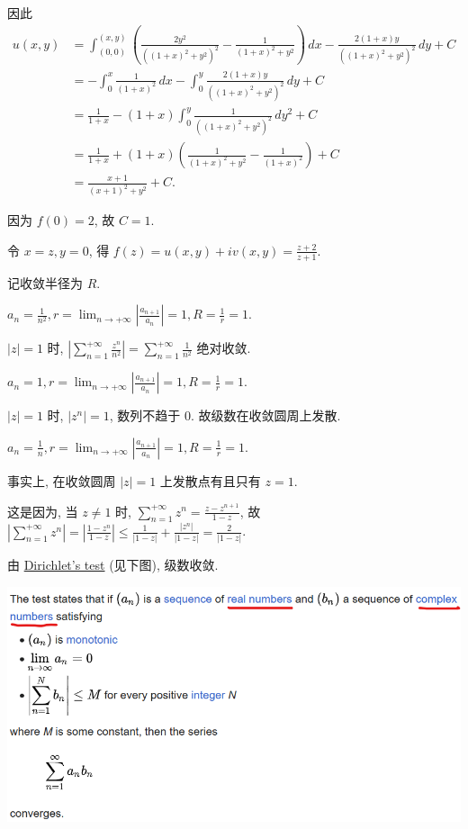\documentclass{homework}
\begin{document}
因此
\begin{align*}
  u(x,y)&=\int_{(0,0)}^{(x,y)}\left(\frac{2 y^2}{((1 + x)^2 + y^2)^2}-\frac{1}{(1 + x)^2 + y^2}\right)\,dx-\frac{2 (1+x) y}{\left((1+x)^2+y^2\right)^2}\,dy+C\\
  &=-\int_{0}^{x}\frac{1}{(1+x)^2}\,dx-\int_{0}^{y}\frac{2 (1+x) y}{\left((1+x)^2+y^2\right)^2}\,dy+C\\
  &=\frac{1}{1+x}-(1+x)\int_{0}^{y} \frac{1}{\left((1+x)^2+y^2\right)^2}\,dy^2+C\\
  &=\frac{1}{1+x}+(1+x)\left(\frac{1}{(1+x)^2+y^2}-\frac{1}{(1+x)^2}\right)+C\\
  &=\frac{x+1}{(x+1)^2+y^2}+C.
\end{align*}

因为 \(f(0)=2\), 故 \(C=1\).

令 \(x=z, y=0\), 得 \(f(z)=u(x,y)+iv(x,y)=\frac{z+2}{z+1}\).

\begin{center}
\end{center}

记收敛半径为 \(R\).

\(a_n=\frac{1}{n^2}, r=\lim_{n\to+\infty}|\frac{a_{n+1}}{a_n}|=1, R=\frac{1}{r}=1\).

\(|z|=1\) 时, \(|\sum_{n=1}^{+\infty}\frac{z^n}{n^2}|=\sum_{n=1}^{+\infty}\frac{1}{n^2}\) 绝对收敛.

\(a_n=1, r=\lim_{n\to+\infty}|\frac{a_{n+1}}{a_n}|=1, R=\frac{1}{r}=1\).

\(|z|=1\) 时, \(|z^n|=1\), 数列不趋于 0. 故级数在收敛圆周上发散.

\(a_n=\frac{1}{n}, r=\lim_{n\to+\infty}|\frac{a_{n+1}}{a_n}|=1, R=\frac{1}{r}=1\).

事实上, 在收敛圆周 \(|z|=1\) 上发散点有且只有 \(z=1\).

这是因为, 当 \(z\neq1\) 时, \(\sum_{n=1}^{+\infty}z^n=\frac{z-z^{n+1}}{1-z}\), 故 \(|\sum_{n=1}^{+\infty}z^n|=|\frac{1-z^n}{1-z}|\leq\frac{1}{|1-z|}+\frac{|z^n|}{|1-z|}=\frac{2}{|1-z|}\).

由 \href{https://en.wikipedia.org/wiki/Dirichlet%27s_test}{Dirichlet's test} (见下图), 级数收敛.

\begin{center}
  \includegraphics[width=.68\columnwidth]{figure/dirichlet.png}
\end{center}
\end{document}
